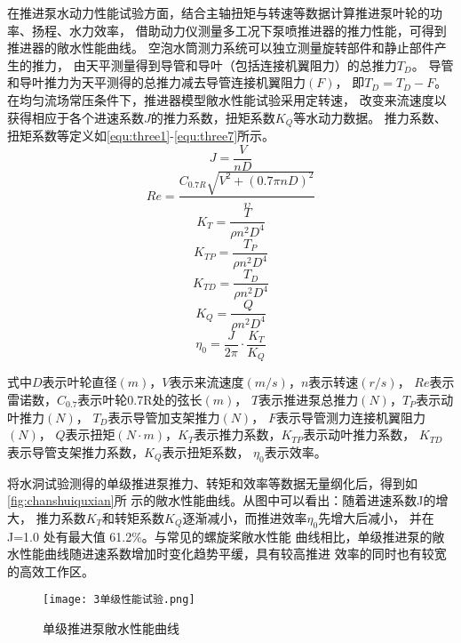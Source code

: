 在推进泵水动力性能试验方面，结合主轴扭矩与转速等数据计算推进泵叶轮的功率、扬程、水力效率，
借助动力仪测量多工况下泵喷推进器的推力性能，可得到推进器的敞水性能曲线。
空泡水筒测力系统可以独立测量旋转部件和静止部件产生的推力，
由天平测量得到导管和导叶（包括连接机翼阻力）的总推力$T_{D}$。
导管和导叶推力为天平测得的总推力减去导管连接机翼阻力$(F)$，
即$T_{D}=T_{D}-F$。在均匀流场常压条件下，推进器模型敞水性能试验采用定转速，
改变来流速度以获得相应于各个进速系数$J$的推力系数，扭矩系数$K_{Q}$等水动力数据。
推力系数、扭矩系数等定义如\autoref{equ:three1}-\autoref{equ:three7}所示。
\begin{equation}
    \label{equ:three1}
    J=\frac{V}{nD} 
\end{equation}
\begin{equation}
    \label{equ:three2}
    Re =\frac{C_{0.7R}\sqrt{V^{2}+\left ( 0.7\pi nD \right )^{2}   }  }{\upsilon } 
\end{equation}
\begin{equation}
    \label{equ:three3}
    K_{T}=\frac{T}{\rho n^{2}D^{4}  }  
\end{equation}
\begin{equation}
    \label{equ:three4}
    K_{TP}=\frac{T_{P} }{\rho n^{2}D^{4}  }  
\end{equation}
\begin{equation}
    \label{equ:three5}
    K_{TD}=\frac{T_{D} }{\rho n^{2}D^{4}  }  
\end{equation}
\begin{equation}
    \label{equ:three6}
    K_{Q}=\frac{Q}{\rho n^{2}D^{4}  }  
\end{equation}
\begin{equation}
    \label{equ:three7}
    \eta _{0} =\frac{J}{2\pi } \cdot \frac{K_{T} }{K_{Q}} 
\end{equation}

式中$D$表示叶轮直径$(m)$，$V$表示来流速度$(m/s)$，$n$表示转速$(r/s)$，
$Re$表示雷诺数，$C_{0.7}$表示叶轮0.7R处的弦长$(m)$，
$T$表示推进泵总推力$(N)$，$T_{P}$表示动叶推力$(N)$，
$T_{D} $表示导管加支架推力$(N)$，
$F$表示导管测力连接机翼阻力$(N)$，
$Q$表示扭矩$(N \cdot m)$，$K_{T}$表示推力系数，$K_{TP}$表示动叶推力系数，
$K_{TD}$表示导管支架推力系数，$K_{Q}$表示扭矩系数，
$\eta _{0}$表示效率。

将水洞试验测得的单级推进泵推力、转矩和效率等数据无量纲化后，得到如\autoref{fig:chanshuiquxian}所
示的敞水性能曲线。从图中可以看出：随着进速系数J的增大，
推力系数$K_T$和转矩系数$K_Q$逐渐减小，而推进效率$\eta_0$先增大后减小，
并在 J=1.0 处有最大值 61.2\%。与常见的螺旋桨敞水性能
曲线相比，单级推进泵的敞水性能曲线随进速系数增加时变化趋势平缓，具有较高推进
效率的同时也有较宽的高效工作区。
\begin{figure}[htbp]
    \centering
    \texttt{[image: 3单级性能试验.png]}
    \caption{\label{fig:chanshuiquxian}单级推进泵敞水性能曲线}
\end{figure}

